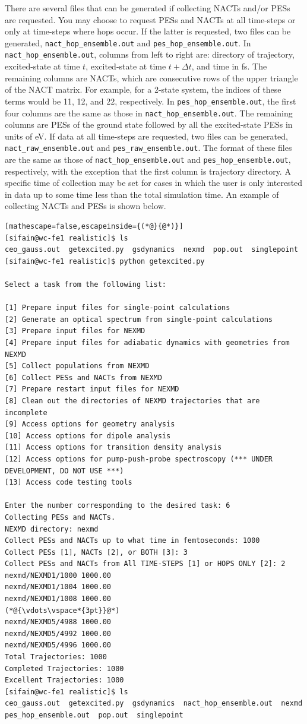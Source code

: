\documentclass[letterpaper,12pt,titlepage]{article}
\begin{document}
There are several files that can be generated if collecting NACTs and/or PESs are requested.  You may choose to request PESs and NACTs at all time-steps or only at time-steps where hops occur.  If the latter is requested, two files can be generated, \verb+nact_hop_ensemble.out+ and \verb+pes_hop_ensemble.out+.  In \verb+nact_hop_ensemble.out+, columns from left to right are: directory of trajectory, excited-state at time $t$, excited-state at time $t+\Delta t$, and time in fs.  The remaining columns are NACTs, which are consecutive rows of the upper triangle of the NACT matrix.  For example, for a 2-state system, the indices of these terms would be 11, 12, and 22, respectively.  In \verb+pes_hop_ensemble.out+, the first four columns are the same as those in \verb+nact_hop_ensemble.out+.  The remaining columns are PESs of the ground state followed by all the excited-state PESs in units of eV.  If data at all time-steps are requested, two files can be generated, \verb+nact_raw_ensemble.out+ and \verb+pes_raw_ensemble.out+.  The format of these files are the same as those of \verb+nact_hop_ensemble.out+ and \verb+pes_hop_ensemble.out+, respectively, with the exception that the first column is trajectory directory.  A specific time of collection may be set for cases in which the user is only interested in data up to some time less than the total simulation time.  An example of collecting NACTs and PESs is shown below.
\begin{lstlisting}[mathescape=false,escapeinside={(*@}{@*)}]
[sifain@wc-fe1 realistic]$ ls
ceo_gauss.out  getexcited.py  gsdynamics  nexmd  pop.out  singlepoint
[sifain@wc-fe1 realistic]$ python getexcited.py 

Select a task from the following list:

[1] Prepare input files for single-point calculations
[2] Generate an optical spectrum from single-point calculations
[3] Prepare input files for NEXMD
[4] Prepare input files for adiabatic dynamics with geometries from NEXMD
[5] Collect populations from NEXMD
[6] Collect PESs and NACTs from NEXMD
[7] Prepare restart input files for NEXMD
[8] Clean out the directories of NEXMD trajectories that are incomplete
[9] Access options for geometry analysis
[10] Access options for dipole analysis
[11] Access options for transition density analysis
[12] Access options for pump-push-probe spectroscopy (*** UNDER DEVELOPMENT, DO NOT USE ***)
[13] Access code testing tools

Enter the number corresponding to the desired task: 6
Collecting PESs and NACTs.
NEXMD directory: nexmd
Collect PESs and NACTs up to what time in femtoseconds: 1000
Collect PESs [1], NACTs [2], or BOTH [3]: 3
Collect PESs and NACTs from All TIME-STEPS [1] or HOPS ONLY [2]: 2
nexmd/NEXMD1/1000 1000.00
nexmd/NEXMD1/1004 1000.00
nexmd/NEXMD1/1008 1000.00
(*@{\vdots\vspace*{3pt}}@*)
nexmd/NEXMD5/4988 1000.00
nexmd/NEXMD5/4992 1000.00
nexmd/NEXMD5/4996 1000.00
Total Trajectories: 1000
Completed Trajectories: 1000
Excellent Trajectories: 1000
[sifain@wc-fe1 realistic]$ ls
ceo_gauss.out  getexcited.py  gsdynamics  nact_hop_ensemble.out  nexmd  pes_hop_ensemble.out  pop.out  singlepoint
\end{lstlisting}
\end{document}
